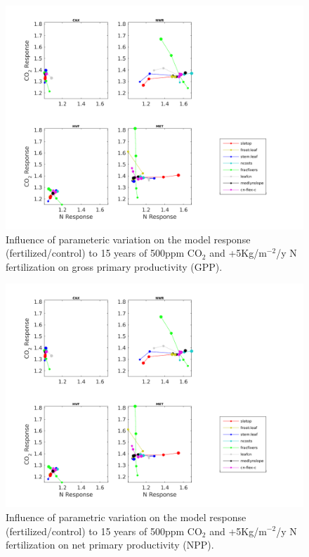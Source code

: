 \usepackage{}\documentclass[draft,linenumbers]{agujournal}
\begin{document}
 \begin{figure}[h]
     \includegraphics[width=1.35\textwidth]{matlab/figures/MAY19jp_relCNdep_defpft_GPP_y2013.png}
     \caption{Influence of parameteric variation on the model response (fertilized/control) to 15 years of 500ppm CO$_{2}$ and +5Kg/m$^{-2}$/y N fertilization on gross primary productivity (GPP). }
     \label{GPP_CN_2016}
  \end{figure}
 
 \begin{figure}[h]
     \includegraphics[width=1.35\textwidth]{matlab/figures/MAY19jp_relCNdep_defpft_GPP_y2013.png}
     \caption{Influence of parametric variation on the model response (fertilized/control) to 15 years of 500ppm CO$_{2}$ and +5Kg/m$^{-2}$/y N fertilization on net primary productivity (NPP).}
     \label{NPP_CN_2016}
  \end{figure}
 
\end{document}
